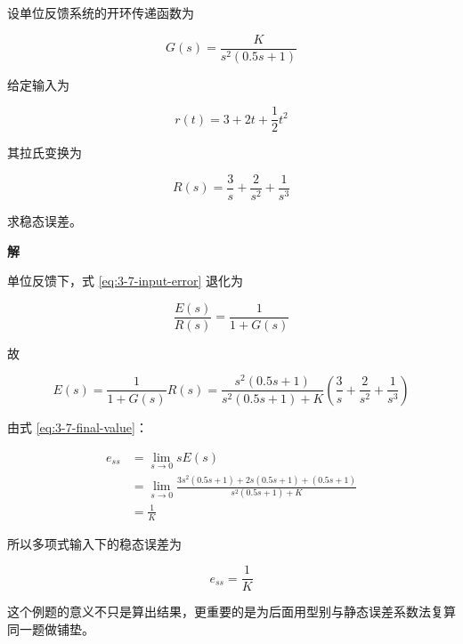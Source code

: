 \documentclass[
  11pt]{article}
\begin{document}
设单位反馈系统的开环传递函数为

\begin{equation}
G(s)=\frac{K}{s^2(0.5s+1)}
\tag{3-7-9}\label{eq:3-7-poly-open-loop}
\end{equation}

给定输入为

\begin{equation}
r(t)=3+2t+\frac{1}{2}t^2
\tag{3-7-10}\label{eq:3-7-poly-input}
\end{equation}

其拉氏变换为

\begin{equation}
R(s)=\frac{3}{s}+\frac{2}{s^2}+\frac{1}{s^3}
\tag{3-7-11}\label{eq:3-7-poly-input-laplace}
\end{equation}

求稳态误差。

\textbf{解}

单位反馈下，式 \ref{eq:3-7-input-error} 退化为

\begin{equation}
\frac{E(s)}{R(s)}=\frac{1}{1+G(s)}
\tag{3-7-12}\label{eq:3-7-unity-error}
\end{equation}

故

\begin{equation}
E(s)=\frac{1}{1+G(s)}R(s)
=\frac{s^2(0.5s+1)}{s^2(0.5s+1)+K}\left(\frac{3}{s}+\frac{2}{s^2}+\frac{1}{s^3}\right)
\tag{3-7-13}\label{eq:3-7-poly-error}
\end{equation}

由式 \ref{eq:3-7-final-value}：

\begin{equation}
\begin{aligned}
e_{ss}
&=\lim_{s\to 0}sE(s) \\
&=\lim_{s\to 0}\frac{3s^2(0.5s+1)+2s(0.5s+1)+(0.5s+1)}{s^2(0.5s+1)+K} \\
&=\frac{1}{K}
\end{aligned}
\tag{3-7-14}\label{eq:3-7-poly-final}
\end{equation}

所以多项式输入下的稳态误差为

\begin{equation}
e_{ss}=\frac{1}{K}
\tag{3-7-15}\label{eq:3-7-poly-answer}
\end{equation}

这个例题的意义不只是算出结果，更重要的是为后面用型别与静态误差系数法复算同一题做铺垫。
\end{document}
